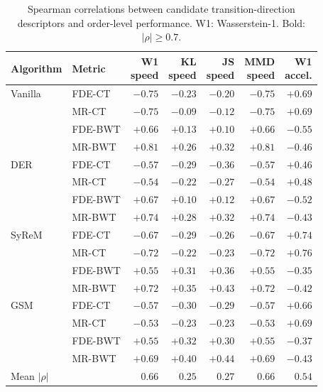 \begin{table}[!t]
\centering
\caption{Spearman correlations between candidate transition-direction descriptors and order-level performance. W1: Wasserstein-1. Bold: $|\rho|\geq0.7$.}
\label{tab:correlation_comparison}
\setlength{\tabcolsep}{2.6pt}
\renewcommand{\arraystretch}{1.02}
\footnotesize
\begin{tabular*}{\columnwidth}{@{\extracolsep{\fill}}llrrrrr@{}}
\toprule
Algorithm & Metric & \shortstack{W1\\speed} & \shortstack{KL\\speed} & \shortstack{JS\\speed} & \shortstack{MMD\\speed} & \shortstack{W1\\accel.} \\
\midrule
Vanilla & FDE-CT & {\boldmath$-0.75$} & $-0.23$ & $-0.20$ & {\boldmath$-0.75$} & $+0.69$ \\
 & MR-CT & {\boldmath$-0.75$} & $-0.09$ & $-0.12$ & {\boldmath$-0.75$} & $+0.69$ \\
 & FDE-BWT & $+0.66$ & $+0.13$ & $+0.10$ & $+0.66$ & $-0.55$ \\
 & MR-BWT & {\boldmath$+0.81$} & $+0.26$ & $+0.32$ & {\boldmath$+0.81$} & $-0.46$ \\
\midrule
DER & FDE-CT & $-0.57$ & $-0.29$ & $-0.36$ & $-0.57$ & $+0.46$ \\
 & MR-CT & $-0.54$ & $-0.22$ & $-0.27$ & $-0.54$ & $+0.48$ \\
 & FDE-BWT & $+0.67$ & $+0.10$ & $+0.12$ & $+0.67$ & $-0.52$ \\
 & MR-BWT & {\boldmath$+0.74$} & $+0.28$ & $+0.32$ & {\boldmath$+0.74$} & $-0.43$ \\
\midrule
SyReM & FDE-CT & $-0.67$ & $-0.29$ & $-0.26$ & $-0.67$ & {\boldmath$+0.74$} \\
 & MR-CT & {\boldmath$-0.72$} & $-0.22$ & $-0.23$ & {\boldmath$-0.72$} & {\boldmath$+0.76$} \\
 & FDE-BWT & $+0.55$ & $+0.31$ & $+0.36$ & $+0.55$ & $-0.35$ \\
 & MR-BWT & {\boldmath$+0.72$} & $+0.35$ & $+0.43$ & {\boldmath$+0.72$} & $-0.42$ \\
\midrule
GSM & FDE-CT & $-0.57$ & $-0.30$ & $-0.29$ & $-0.57$ & $+0.66$ \\
 & MR-CT & $-0.53$ & $-0.23$ & $-0.23$ & $-0.53$ & $+0.69$ \\
 & FDE-BWT & $+0.55$ & $+0.32$ & $+0.30$ & $+0.55$ & $-0.37$ \\
 & MR-BWT & $+0.69$ & $+0.40$ & $+0.44$ & $+0.69$ & $-0.43$ \\
\midrule
\multicolumn{2}{l}{Mean $|\rho|$} & $0.66$ & $0.25$ & $0.27$ & $0.66$ & $0.54$ \\
\bottomrule
\end{tabular*}
\end{table}
